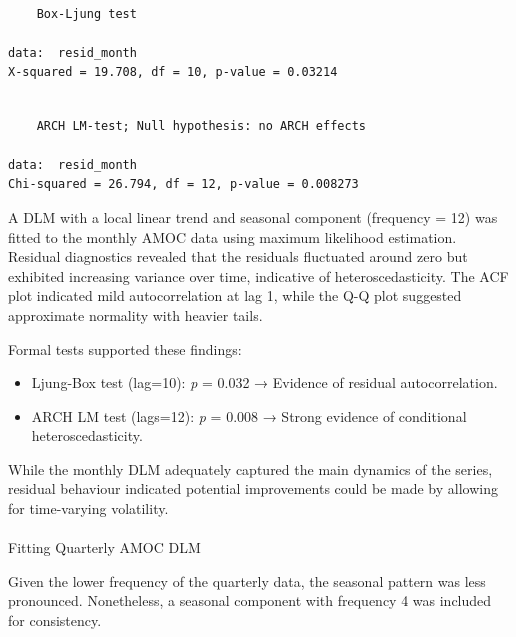 \documentclass[
  11pt,
]{article}
\makeatletter
\let\oldparagraph\paragraph
\renewcommand{\paragraph}{
    \@ifstar
      \xxxParagraphStar
      \xxxParagraphNoStar
  }
\newcommand{\xxxParagraphStar}[1]{\oldparagraph*{#1}\mbox{}}
\newcommand{\xxxParagraphNoStar}[1]{\oldparagraph{#1}\mbox{}}
\makeatother
\begin{document}
\begin{verbatim}

    Box-Ljung test

data:  resid_month
X-squared = 19.708, df = 10, p-value = 0.03214
\end{verbatim}

\begin{verbatim}

    ARCH LM-test; Null hypothesis: no ARCH effects

data:  resid_month
Chi-squared = 26.794, df = 12, p-value = 0.008273
\end{verbatim}

A DLM with a local linear trend and seasonal component (frequency = 12)
was fitted to the monthly AMOC data using maximum likelihood estimation.
Residual diagnostics revealed that the residuals fluctuated around zero
but exhibited increasing variance over time, indicative of
heteroscedasticity. The ACF plot indicated mild autocorrelation at lag
1, while the Q-Q plot suggested approximate normality with heavier
tails.

Formal tests supported these findings:

\begin{itemize}
\item
  Ljung-Box test (lag=10): \emph{p} = 0.032 → Evidence of residual
  autocorrelation.
\item
  ARCH LM test (lags=12): \emph{p} = 0.008 → Strong evidence of
  conditional heteroscedasticity.
\end{itemize}

While the monthly DLM adequately captured the main dynamics of the
series, residual behaviour indicated potential improvements could be
made by allowing for time-varying volatility.

\paragraph{Fitting Quarterly AMOC DLM}\label{fitting-quarterly-amoc-dlm}

Given the lower frequency of the quarterly data, the seasonal pattern
was less pronounced. Nonetheless, a seasonal component with frequency 4
was included for consistency.
\end{document}
